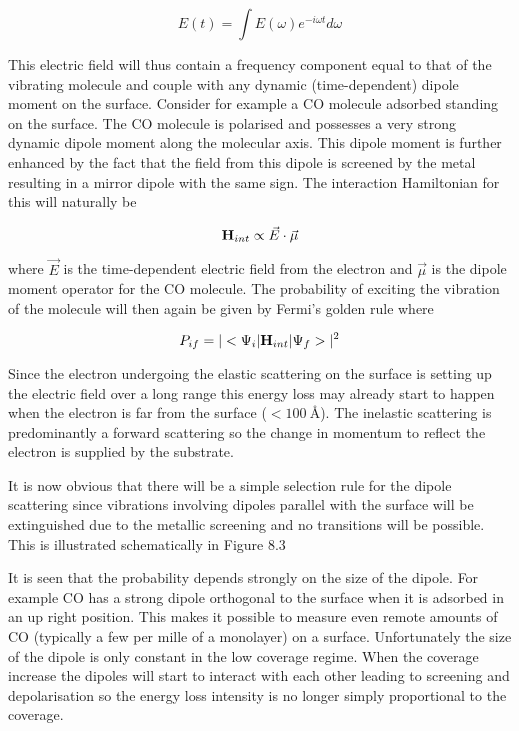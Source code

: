 \begin{equation}
E(t)=\int E(\omega)e^{-i\omega t}d\omega
\end{equation}

This electric field will thus contain a frequency component equal to that of the vibrating molecule and couple with any dynamic (time-dependent) dipole moment on the surface. Consider for example a CO molecule adsorbed standing on the surface. The  CO molecule is polarised and possesses a very strong dynamic  dipole moment along the molecular axis. This dipole moment is further enhanced by the fact that the field from this dipole is screened by the metal resulting in a mirror dipole with the same sign. The interaction Hamiltonian for this will naturally be

\begin{equation}
{\bf H}_{int}\propto \vec{E}\cdot\vec{\mu}
\end{equation}
 
\noindent where $\vec{E}$ is the time-dependent electric field from the electron and $\vec{\mu}$ is the dipole moment operator for the CO molecule. The probability of exciting the vibration of the molecule will then again be given by Fermi's golden rule where

\begin{equation}
P_{if}=\vert <\Psi_i\vert{\bf H}_{int}\vert\Psi_f>\vert^2
\end{equation}

Since the electron undergoing the elastic scattering on the surface is setting up the electric field over a long range this energy loss may already start to happen when the electron is far from the surface ($<\SI{100}{\angstrom}$). The inelastic scattering is predominantly a forward scattering so the change in momentum to reflect the electron is supplied by the substrate.

It is now obvious that there will be a simple selection rule for the dipole scattering since vibrations involving dipoles parallel with the surface will be extinguished due to the metallic screening and no transitions will be possible. This is illustrated schematically in Figure 8.3

It is seen that the probability depends strongly on the size of the dipole. For example CO has a strong dipole orthogonal to the surface when it is adsorbed in an up right position. This makes it possible to measure  even remote amounts of CO (typically a few per mille of a monolayer) on a surface. Unfortunately the size of the dipole is only constant in the low coverage regime. When the coverage increase the dipoles will start to interact with each other leading to screening and depolarisation so the energy loss intensity is no longer simply  proportional to the coverage. 


